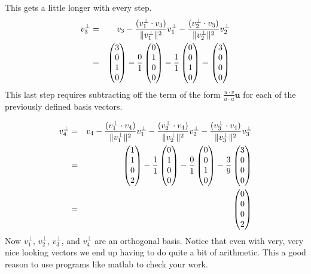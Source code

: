 {This gets a little longer with every step.
\begin{eqnarray*}
v_3^\bot &=& v_3  -\frac{(v_1^\bot \cdot v_3 )}{\|v_1^\bot\|^2} v_1^\bot  -\frac{(v_2^\bot \cdot v_3 )}{\|v_2^\bot\|^2} v_2^\bot\\
&=&\begin{pmatrix} 3\\0 \\ 1\\ 0 \end{pmatrix}- \frac{0}{1} \begin{pmatrix} 0\\1 \\ 0\\ 0 \end{pmatrix} - \frac{1}{1}  \begin{pmatrix} 0\\0\\ 1\\ 0 \end{pmatrix}  = \begin{pmatrix} 3\\0 \\ 0\\ 0 \end{pmatrix}\\
\end{eqnarray*} 
This last step requires subtracting off the term of the form $\frac{u\cdot v}{u \cdot u} \mathbf{u}$ for each of the previously defined basis vectors.

\begin{eqnarray*}
v_4^\bot &=& v_4  - \frac{(v_1^\bot \cdot v_4 )}{\|v_1^\bot\|^2} v_1^\bot  -\frac{(v_2^\bot \cdot v_4 )}{\|v_2^\bot\|^2} v_2^\bot  -\frac{(v_3^\bot \cdot v_4 )}{\|v_3^\bot\|^2} v_3^\bot \\
&=& \begin{pmatrix} 1\\ 1\\ 0\\2 \end{pmatrix}  -\frac{1}{1}  \begin{pmatrix} 0\\1 \\ 0\\ 0 \end{pmatrix}  - \frac{0}{1} \begin{pmatrix} 0\\0\\ 1\\ 0 \end{pmatrix}  -\frac{3}{9}  \begin{pmatrix} 3\\0 \\ 0\\ 0 \end{pmatrix} \\
&=& \begin{pmatrix} 0\\ 0\\ 0\\2 \end{pmatrix}
\end{eqnarray*}
Now $v_1^\bot$,  $v_2^\bot$, $v_3^\bot$, and $v_4^\bot$ are an orthogonal basis. Notice that even with very, very nice looking vectors we end up having to do quite a bit of arithmetic. This a good reason to use programs like matlab to check your work.
}

